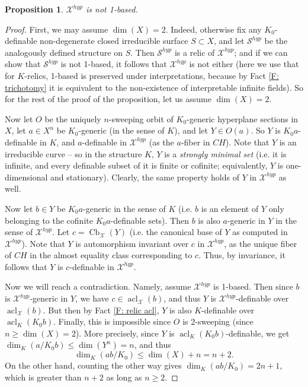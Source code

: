 \documentclass{amsart}
\newtheorem{proposition}[theorem]{Proposition}
\theoremstyle{definition}
\newcommand{\acl}{\operatorname{acl}}
\begin{document}
\begin{proposition}\label{P: 1-based}
    $\mathcal X^{hyp}$ is not 1-based.
\end{proposition}
\begin{proof}
    First, we may assume $\dim(X)=2$. Indeed, otherwise fix any $K_0$-definable non-degenerate closed irreducible surface $S\subset X$, and let $\mathcal S^{hyp}$ be the analogously defined structure on $S$. Then $\mathcal S^{hyp}$ is a relic of $\mathcal X^{hyp}$; and if we can show that $\mathcal S^{hyp}$ is not 1-based, it follows that $\mathcal X^{hyp}$ is not either (here we use that for $K$-relics, 1-based is preserved under interpretations, because by Fact \ref{F: trichotomy} it is equivalent to the non-existence of interpretable infinite fields). So for the rest of the proof of the proposition, let us assume $\dim(X)=2$.

    Now let $O$ be the uniquely $n$-sweeping orbit of $K_0$-generic hyperplane sections in $X$, let $a\in X^n$ be $K_0$-generic (in the sense of $K$), and let $Y\in O(a)$. So $Y$ is $K_0a$-definable in $K$, and $a$-definable in $\mathcal X^{hyp}$ (as the $a$-fiber in $CH$). Note that $Y$ is an irreducible curve -- so in the structure $K$, $Y$ is a \textit{strongly minimal set} (i.e. it is infinite, and every definable subset of it is finite or cofinite; equivalently, $Y$ is one-dimensional and stationary). Clearly, the same property holds of $Y$ in $\mathcal X^{hyp}$ as well.
    
    Now let $b\in Y$ be $K_0a$-generic in the sense of $K$ (i.e. $b$ is an element of $Y$ only belonging to the cofinite $K_0a$-definable sets). Then $b$ is also $a$-generic in $Y$ in the sense of $\mathcal X^{hyp}$. Let $c=\operatorname{Cb}_{\mathcal X}(Y)$ (i.e. the canonical base of $Y$ as computed in $\mathcal X^{hyp}$). Note that $Y$ is automorphism invariant over $c$ in $\mathcal X^{hyp}$, as the unique fiber of $CH$ in the almost equality class corresponding to $c$. Thus, by invariance, it follows that $Y$ is $c$-definable in $\mathcal X^{hyp}$.
    
    Now we will reach a contradiction. Namely, assume $\mathcal X^{hyp}$ is  1-based. Then since $b$ is $\mathcal X^{hyp}$-generic in $Y$, we have $c\in\acl_{\mathcal X}(b)$, and thus $Y$ is $\mathcal X^{hyp}$-definable over $\acl_{\mathcal X}(b)$. But then by Fact \ref{F: relic acl}, $Y$ is also $K$-definable over $\acl_K(K_0b)$. Finally, this is impossible since $O$ is 2-sweeping (since $n\geq\dim(X)=2$). More precisely, since $Y$ is $\acl_K(K_0b)$-definable, we get $\dim_K(a/K_0b)\leq\dim(Y^n)=n$, and thus $$ \dim_K(ab/K_0)\leq\dim(X)+n=n+2.$$ On the other hand, counting the other way gives $\dim_K(ab/K_0)=2n+1$, which is greater than $n+2$ as long as $n\geq 2$.
    \end{proof}
\end{document}
